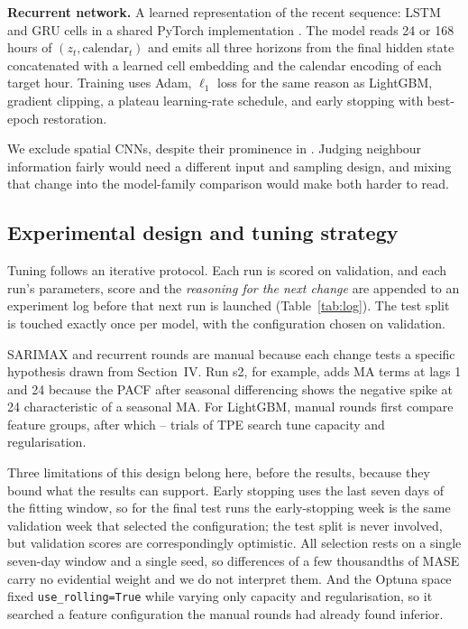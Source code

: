 \documentclass[conference,onecolumn,11pt]{IEEEtran}
\providecommand{\optunaTrials}{--}
\begin{document}
\textbf{Recurrent network.} A learned representation of the recent sequence: LSTM \cite{hochreiter1997} and GRU \cite{cho2014} cells in a shared PyTorch implementation \cite{paszke2019}. The model reads 24 or 168 hours of $(z_t,\text{calendar}_t)$ and emits all three horizons from the final hidden state concatenated with a learned cell embedding and the calendar encoding of each target hour. Training uses Adam, $\ell_1$ loss for the same reason as LightGBM, gradient clipping, a plateau learning-rate schedule, and early stopping with best-epoch restoration.

We exclude spatial CNNs, despite their prominence in \cite{wang2017,zhang2018}. Judging neighbour information fairly would need a different input and sampling design, and mixing that change into the model-family comparison would make both harder to read.

\subsection{Experimental design and tuning strategy}
Tuning follows an iterative protocol. Each run is scored on validation, and each run's parameters, score and the \emph{reasoning for the next change} are appended to an experiment log before that next run is launched (Table~\ref{tab:log}). The test split is touched exactly once per model, with the configuration chosen on validation.

SARIMAX and recurrent rounds are manual because each change tests a specific hypothesis drawn from Section~IV. Run s2, for example, adds MA terms at lags 1 and 24 because the PACF after seasonal differencing shows the negative spike at 24 characteristic of a seasonal MA. For LightGBM, manual rounds first compare feature groups, after which \optunaTrials{} trials of TPE search \cite{akiba2019} tune capacity and regularisation.

Three limitations of this design belong here, before the results, because they bound what the results can support. Early stopping uses the last seven days of the fitting window, so for the final test runs the early-stopping week is the same validation week that selected the configuration; the test split is never involved, but validation scores are correspondingly optimistic. All selection rests on a single seven-day window and a single seed, so differences of a few thousandths of MASE carry no evidential weight and we do not interpret them. And the Optuna space fixed \texttt{use\_rolling=True} while varying only capacity and regularisation, so it searched a feature configuration the manual rounds had already found inferior.
\end{document}

